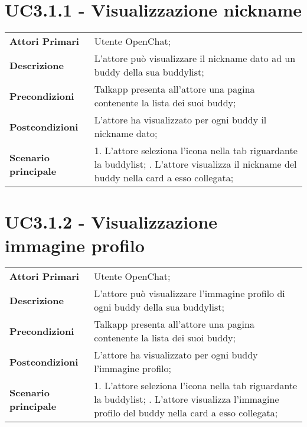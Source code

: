 \section{UC3.1.1 - Visualizzazione nickname}
\begin{center}
	\bgroup
	\def\arraystretch{1.8}     
	\begin{longtable}{  p{4cm} | p{9.5cm} } 
		\textbf{Attori Primari} & Utente OpenChat; \\ 
		\textbf{Descrizione} &  L'attore può visualizzare il nickname dato ad un buddy della sua buddylist; \\ 
		\textbf{Precondizioni}  & Talkapp presenta all'attore una pagina contenente la lista dei suoi buddy; \\
		\textbf{Postcondizioni} & L'attore ha visualizzato per ogni buddy il nickname dato;  \\ 
		\textbf{Scenario principale} & 
		1. L'attore seleziona l'icona nella tab riguardante la buddylist; \newline
		2. L'attore visualizza il nickname del buddy nella card a esso collegata;
	\end{longtable}
	\egroup
\end{center}
\section{UC3.1.2 - Visualizzazione immagine profilo}
\begin{center}
	\bgroup
	\def\arraystretch{1.8}     
	\begin{longtable}{  p{4cm} | p{9.5cm} } 
		\textbf{Attori Primari} & Utente OpenChat; \\ 
		\textbf{Descrizione} &  L'attore può visualizzare l'immagine profilo di ogni buddy della sua buddylist; \\ 
		\textbf{Precondizioni}  & Talkapp presenta all'attore una pagina contenente la lista dei suoi buddy; \\
		\textbf{Postcondizioni} & L'attore ha visualizzato per ogni buddy  l'immagine profilo;  \\ 
		\textbf{Scenario principale} & 
		1. L'attore seleziona l'icona nella tab riguardante la buddylist; \newline
		2. L'attore visualizza l'immagine profilo del buddy nella card a esso collegata;
	\end{longtable}
	\egroup
\end{center}
